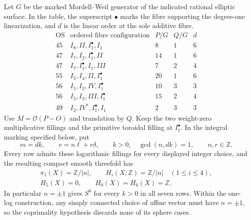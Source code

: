 \begin{theorem}
Let $G$ be the marked Mordell--Weil generator of the indicated
rational elliptic surface. In the table, the superscript $\bullet$
marks the fibre supporting the degree-one linearization, and $d$
is the linear order at the sole additive fibre.
\[
 \begin{array}{c|l|rr|r}
 \mathrm{OS}&\text{ordered fibre configuration}&P/G&Q/G&d\\\hline
 45&I_8,II,I_1^\bullet,I_1&8&1&6\\
 47&I_7,I_2,I_1^\bullet,II&14&1&6\\
 47&I_7,I_1^\bullet,I_1,III&7&2&4\\
 55&I_5,I_4,II,I_1^\bullet&20&1&6\\
 56&I_5,I_2,IV,I_1^\bullet&10&3&3\\
 56&I_5,I_3,III,I_1^\bullet&15&2&4\\
 49&I_2,IV^*,I_1^\bullet,I_1&2&3&3
 \end{array}
\]
Use $M=\mathcal O(P-O)$ and translation by $Q$.
Keep the two weight-zero multiplicative fillings and the
primitive toroidal filling at $I_1^\bullet$.
In the integral marking specified below, put
\[
 m=dk,\qquad v=n\ell+r\delta,
 \qquad k>0,\quad\gcd(n,dk)=1,
 \qquad n,r\in\mathbb Z.
\]
Every row admits these logarithmic fillings for every displayed
integer choice, and the resulting compact smooth threefold has
\[
 \begin{gathered}
 \pi_1(X)=\mathbb Z/|n|,\qquad
 H_i(X;\mathbb Z)=\mathbb Z/|n|\quad(1\leq i\leq4),\\
 H_5(X)=0,\qquad H_0(X)=H_6(X)=\mathbb Z.
 \end{gathered}
\]
In particular $n=\pm1$ gives $S^6$ for every $k>0$ in all seven
rows. Within the one-log construction, any simply connected
choice of affine vector must have $n=\pm1$, so the coprimality
hypothesis discards none of its sphere cases.
\end{theorem}


